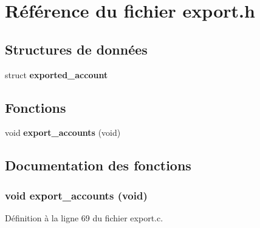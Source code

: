 \section{Référence du fichier export.h}
\label{export_8h}
\subsection*{Structures de données}
\begin{DoxyCompactItemize}
\item 
struct {\bf exported\_\-account}
\end{DoxyCompactItemize}
\subsection*{Fonctions}
\begin{DoxyCompactItemize}
\item 
void {\bf export\_\-accounts} (void)
\end{DoxyCompactItemize}


\subsection{Documentation des fonctions}
\subsubsection[{export\_\-accounts}]{\setlength{\rightskip}{0pt plus 5cm}void export\_\-accounts (void)}\label{export_8h_a9aac8675a6963d748b4c566cd5a8912c}


Définition à la ligne 69 du fichier export.c.

